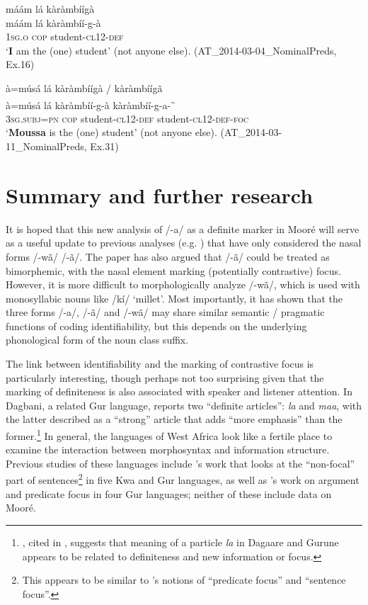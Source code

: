 \documentclass[output=paper]{langsci/langscibook}
\begin{document}
\ea\label{ex:teo:63}
\glll máám lá kàràmbíígà\\
máám lá kàràmbíí-g-à\\
\textsc{1sg.o} \textsc{cop} student-\textsc{cl12-def}\\
\glt ‘\textbf{I} am the (one) student’ (not anyone else). (AT\_2014-03-04\_NominalPreds, Ex.16)
\z

\ea\label{ex:teo:64}
\glll à=músá lá {kàràmbíígà /} kàràmbíígã \\
à=músá lá kàràmbíí-g-à kàràmbíí-g-a-\textsuperscript{\~{}} \\
\textsc{3sg.subj=pn} \textsc{cop} student-\textsc{cl12-def} student-\textsc{cl12-def-foc}\\
\glt ‘\textbf{Mo}\textbf{ussa} is the (one) student’ (not anyone else). (AT\_2014-03-11\_NominalPreds, Ex.31)
\z

\section{Summary and further research}\label{sec:teo:8}

It is hoped that this new analysis of /-a/ as a definite marker in Mooré will serve as a useful update to previous analyses (e.g. \citealt{Peterson1971,canu1974}) that have only considered the nasal forms /-wã/ {\Tilde} /-ã/. The paper has also argued that /-ã/ could be treated as bimorphemic, with the nasal element marking (potentially contrastive) focus. However, it is more difficult to morphologically analyze /-wã/, which is used with monosyllabic nouns like /kí/ ‘millet’. Most importantly, it has shown that the three forms /-a/, /-ã/ and /-wã/ may share similar semantic / pragmatic functions of coding identifiability, but this depends on the underlying phonological form of the noun class suffix.

The link between identifiability and the marking of contrastive focus is particularly interesting, though perhaps not too surprising given that the marking of definiteness is also associated with speaker and listener attention. In Dagbani, a related Gur language, \citet[40]{Olawsky1999} reports two “definite articles”: \textit{la} and \textit{maa}, with the latter described as a “strong” article that adds “more emphasis” than the former.\footnote{\cite{KroppDakubu1991}, cited in \citet[30]{Olawsky1999}, suggests that meaning of a particle \textit{la} in Dagaare and Gurune appears to be related to definiteness and new information or focus.} In general, the languages of West Africa look like a fertile place to examine the interaction between morphosyntax and information structure. Previous studies of these languages include \cite{FiedlerSchwarz2005}'s work that looks at the “non-focal” part of sentences\footnote{This appears to be similar to \cite{Lambrecht1994}'s notions of “predicate focus” and “sentence focus”.} in five Kwa and Gur languages, as well as \cite{Schwarz2010gur}'s work on argument and predicate focus in four Gur languages; neither of these include data on Mooré.
\end{document}
